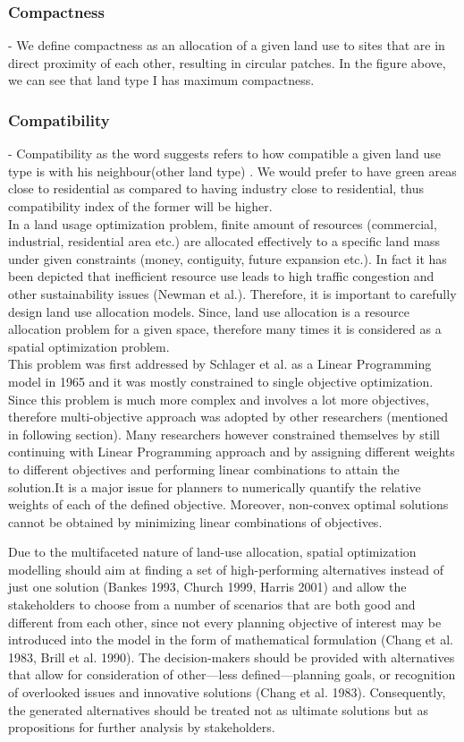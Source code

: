 \documentclass[twoside,10pt]{article}
\begin{document}
\subsubsection*{Compactness} - We define compactness as an allocation of a given land use to sites that are in direct proximity of each other, resulting in circular patches. In the figure above, we can see that land type I has maximum compactness.

\subsubsection*{Compatibility} - Compatibility  as the word suggests refers to how compatible a given land use type is with his neighbour(other land type) . We would prefer to have green areas close to residential as compared to having industry close to residential, thus compatibility index of the former will be higher.\\[.25cm]

In a land usage optimization problem, finite amount of resources (commercial, industrial, residential area etc.) are allocated effectively to a specific land mass under given constraints (money, contiguity, future expansion etc.). In fact it has been depicted that inefficient resource use leads to high traffic congestion and other sustainability issues (Newman et al.). Therefore, it is important to carefully design land use allocation models. Since, land use allocation is a resource allocation problem for a given space, therefore many times it is considered as a spatial optimization problem. \\
This problem was first addressed by Schlager et al. as a Linear Programming model in 1965 and it was mostly constrained to single objective optimization. Since this problem is much more complex and involves a lot more objectives, therefore multi-objective approach was adopted by other researchers (mentioned in following section).  Many researchers however constrained themselves by still continuing with Linear Programming approach and by assigning different weights to different objectives and performing linear combinations to attain the solution.It is a major issue for planners to numerically quantify the relative weights of each of the defined objective. Moreover, non-convex optimal solutions cannot be obtained by minimizing linear combinations of objectives.


Due to the multifaceted nature of land-use allocation, spatial optimization modelling should aim at finding a set of high-performing alternatives instead of just one solution (Bankes 1993, Church 1999, Harris 2001) and allow the stakeholders to choose from a number of scenarios that are both good and different from each other, since not every planning objective of interest may be introduced into the
model in the form of mathematical formulation (Chang et al. 1983, Brill et al. 1990). The decision-makers should be provided with alternatives that allow for consideration of other—less defined—planning goals, or recognition of overlooked issues and innovative solutions (Chang et al. 1983). Consequently, the generated alternatives should be treated not as ultimate solutions but as propositions for further analysis by stakeholders.
\end{document}
